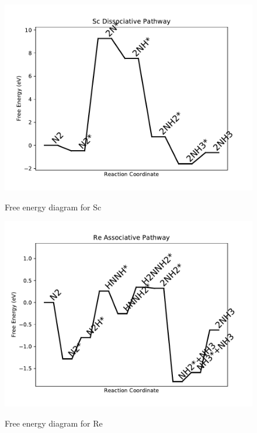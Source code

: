 \documentclass[journal=jacsat,manuscript=article]{achemso}
\begin{document}
\begin{figure}
\includegraphics[width=1\linewidth]{data/plots/Sc_dissociative.pdf}
\label{fig:Sc_dissociative}
\caption{Free energy diagram for Sc}
\end{figure}

\newpage
\begin{figure}
\includegraphics[width=1\linewidth]{data/plots/Re_associative.pdf}
\label{fig:Re_associative}
\caption{Free energy diagram for Re}
\end{figure}
\end{document}

